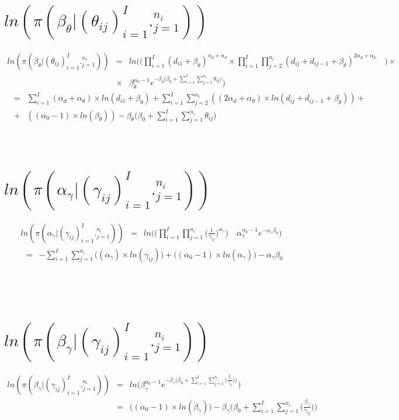 \documentclass[10pt]{report}
\theoremstyle{plain}
\begin{document}
\section{$ln(\pi(\beta_\theta|(\theta_{ij})_{i=1}^I._{j=1}^{n_i}))$}
\begin{eqnarray*}
ln(\pi(\beta_\theta|(\theta_{ij})_{i=1}^I._{j=1}^{n_i})) &=& ln\Bigg( \Bigg(\prod_{i=1}^I (d_{i1}+\beta_\theta)^{\alpha_d+\alpha_\theta}\times\prod_{i=1}^I \prod_{j=2}^{n_i} (d_{ij}+d_{ij-1}+\beta_\theta)^{2\alpha_d+\alpha_\theta}\quad \Bigg)\times \\
&\times&\beta_\theta^{\alpha_0-1} e^{-\beta_\theta\big(\beta_0+\sum_{i=1}^I \sum_{j=1}^{n_i}\theta_{ij}\big)}\Bigg)
\end{eqnarray*}
\begin{eqnarray*}
&=&\sum_{i=1}^I (\alpha_d+\alpha_\theta)\times ln(d_{i1}+\beta_\theta)+\sum_{i=1}^I \sum_{j=2}^{n_i} ((2\alpha_d+\alpha_\theta)\times ln(d_{ij}+d_{ij-1}+\beta_\theta))+\\
&+&((\alpha_0-1)\times ln(\beta_\theta))-\beta_\theta\bigg(\beta_0+\sum_{i=1}^I \sum_{j=1}^{n_i} \theta_{ij}\bigg)
\end{eqnarray*}
\\
\\
\section{$ln(\pi(\alpha_\gamma|(\gamma_{ij})_{i=1}^I._{j=1}^{n_i}))$}
\begin{eqnarray*}
ln(\pi(\alpha_\gamma|(\gamma_{ij})_{i=1}^I._{j=1}^{n_i})) &=& ln\Bigg(\Bigg(\prod_{i=1}^I \prod_{j=1}^{n_i} \Big(\frac{1}{\gamma_{ij}}\Big)^{\alpha_\gamma}\Bigg) \quad \alpha_\gamma^{\alpha_0-1}e^{-\alpha_\gamma\beta_0}\Bigg)
\end{eqnarray*}
\begin{eqnarray*}
&=& -\sum_{i=1}^I \sum_{j=1}^{n_i} \big((\alpha_\gamma)\times ln(\gamma_{ij})\big)+\big((\alpha_0-1)\times ln(\alpha_\gamma)\big)-\alpha_\gamma\beta_0
\end{eqnarray*}
\\
\\
\\
\section{$ln(\pi(\beta_\gamma|(\gamma_{ij})_{i=1}^I._{j=1}^{n_i}))$}
\begin{eqnarray*}
ln(\pi(\beta_\gamma|(\gamma_{ij})_{i=1}^I._{j=1}^{n_i}))&=&ln\Bigg(\beta_\gamma^{\alpha_0-1} e^{-\beta_\gamma\big(\beta_0+\sum_{i=1}^I \sum_{j=1}^{n_i}\big(\frac{\beta_\gamma}{\gamma_{ij}}\big))}\Bigg)\\
&=&\Bigg((\alpha_0-1)\times ln(\beta_\gamma)\big)-\beta_\gamma\bigg(\beta_0+\sum_{i=1}^I \sum_{j=1}^{n_i}\big(\frac{\beta_\gamma}{\gamma_{ij}}\bigg)\Bigg)
\end{eqnarray*}
\end{document}
